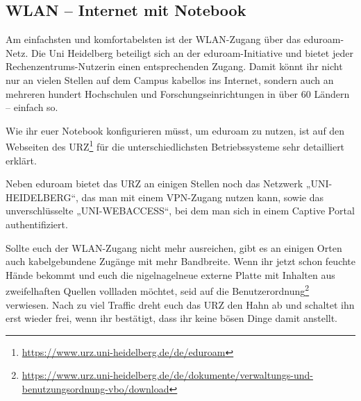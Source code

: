 \subsection{WLAN -- Internet mit Notebook}

\begin{figure}[h]
    \centering
    \vspace{-5mm}

    \vspace{-5mm}

\end{figure}




Am einfachsten und komfortabelsten ist der WLAN-Zugang über das e\-du\-roam-Netz. Die Uni Heidelberg beteiligt sich an der eduroam-Initiative und bietet jeder Rechenzentrums-Nutzerin einen entsprechenden Zugang. Damit könnt ihr nicht nur an vielen Stellen auf dem Campus kabellos ins Internet, sondern auch an mehreren hundert Hochschulen und Forschungseinrichtungen in über 60 Ländern – einfach so.

Wie ihr euer Notebook konfigurieren müsst, um eduroam zu nutzen, ist auf den Webseiten des URZ\footnote{\url{https://www.urz.uni-heidelberg.de/de/eduroam}} für die unterschiedlichsten Betriebssysteme sehr detailliert erklärt.

Neben eduroam bietet das URZ an einigen Stellen noch das Netzwerk „UNI-HEIDELBERG“, das man mit einem VPN-Zugang nutzen kann, sowie das unverschlüsselte „UNI-WEBACCESS“, bei dem man sich in einem Captive Portal authentifiziert.

Sollte euch der WLAN-Zugang nicht mehr ausreichen, gibt es an einigen Orten auch kabelgebundene Zugänge mit mehr Bandbreite. Wenn ihr jetzt schon feuchte Hände bekommt und euch die nigelnagelneue externe Platte mit Inhalten aus zweifelhaften Quellen vollladen möchtet, seid auf die Benutzerordnung\footnote{\url{https://www.urz.uni-heidelberg.de/de/dokumente/verwaltungs-und-benutzungsordnung-vbo/download}} verwiesen. Nach zu viel Traffic dreht euch das \gls{URZ} den Hahn ab und schaltet ihn erst wieder frei, wenn ihr bestätigt, dass ihr keine bösen Dinge damit anstellt.

